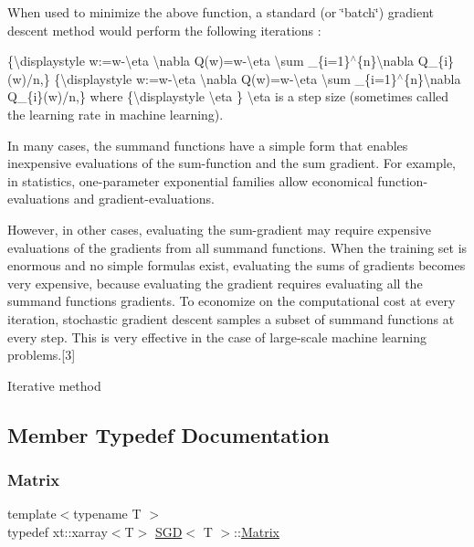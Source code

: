 When used to minimize the above function, a standard (or \char`\"{}batch\char`\"{}) gradient descent method would perform the following iterations \+:

\{\textbackslash{}displaystyle w\+:=w-\/\textbackslash{}eta \textbackslash{}nabla Q(w)=w-\/\textbackslash{}eta \textbackslash{}sum \+\_\+\{i=1\}$^\wedge$\{n\}\textbackslash{}nabla Q\+\_\+\{i\}(w)/n,\} \{\textbackslash{}displaystyle w\+:=w-\/\textbackslash{}eta \textbackslash{}nabla Q(w)=w-\/\textbackslash{}eta \textbackslash{}sum \+\_\+\{i=1\}$^\wedge$\{n\}\textbackslash{}nabla Q\+\_\+\{i\}(w)/n,\} where \{\textbackslash{}displaystyle \textbackslash{}eta \} \textbackslash{}eta is a step size (sometimes called the learning rate in machine learning).

In many cases, the summand functions have a simple form that enables inexpensive evaluations of the sum-\/function and the sum gradient. For example, in statistics, one-\/parameter exponential families allow economical function-\/evaluations and gradient-\/evaluations.

However, in other cases, evaluating the sum-\/gradient may require expensive evaluations of the gradients from all summand functions. When the training set is enormous and no simple formulas exist, evaluating the sums of gradients becomes very expensive, because evaluating the gradient requires evaluating all the summand functions\textquotesingle{} gradients. To economize on the computational cost at every iteration, stochastic gradient descent samples a subset of summand functions at every step. This is very effective in the case of large-\/scale machine learning problems.\mbox{[}3\mbox{]}

Iterative method 

\subsection{Member Typedef Documentation}
\mbox{\label{class_s_g_d_a0c157dbad2dc900c00b9ca57f23ba676}} 
\subsubsection{\texorpdfstring{Matrix}{Matrix}}
{\footnotesize\ttfamily template$<$typename T $>$ \\
typedef xt\+::xarray$<$T$>$ \mbox{\hyperlink{class_s_g_d}{S\+GD}}$<$ T $>$\+::\mbox{\hyperlink{class_s_g_d_a0c157dbad2dc900c00b9ca57f23ba676}{Matrix}}}

